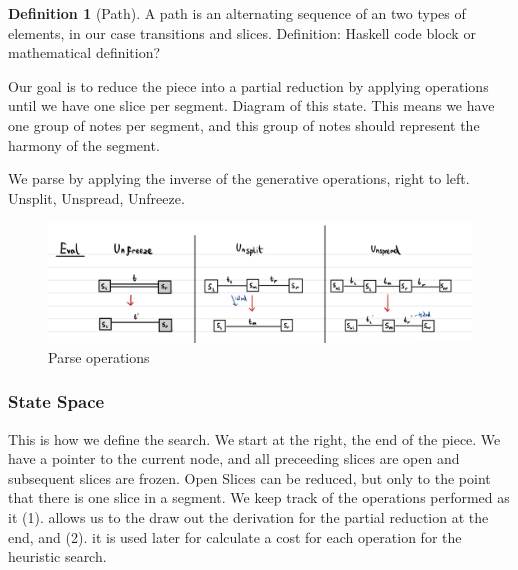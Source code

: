 \documentclass[12pt,a4paper,twoside,openright]{report}
\theoremstyle{definition}
\newtheorem{definition}{Definition}[section]
\begin{document}
\begin{definition}[Path]
A path is an alternating sequence of an two types of elements, in our case transitions and slices. Definition: Haskell code block or mathematical definition?
\end{definition}

Our goal is to reduce the piece into a partial reduction by applying operations until we have one slice per segment. Diagram of this state. This means we have one group of notes per segment, and this group of notes should represent the harmony of the segment.

We parse by applying the inverse of the generative operations, right to left. Unsplit, Unspread, Unfreeze.
\par


\begin{figure}[ht]
  \centering
  \includegraphics[width=\textwidth]{parseops}
  \caption{Parse operations}
  \label{fig:parseops}
\end{figure}

\FloatBarrier
\subsubsection{State Space}

This is how we define the search. We start at the right, the end of the piece. We have a pointer to the current node, and all preceeding slices are open and subsequent slices are frozen. Open Slices can be reduced, but only to the point that there is one slice in a segment. We keep track of the operations performed as it (1). allows us to the draw out the derivation for the partial reduction at the end, and (2). it is used later for calculate a cost for each operation for the heuristic search.




\end{document}
